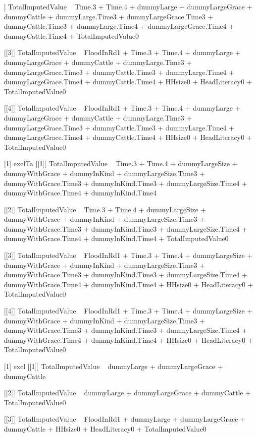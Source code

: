\begin{Schunk}
\begin{Soutput}
[[2]]
TotalImputedValue ~ Time.3 + Time.4 + dummyLarge + dummyLargeGrace + 
    dummyCattle + dummyLarge.Time3 + dummyLargeGrace.Time3 + 
    dummyCattle.Time3 + dummyLarge.Time4 + dummyLargeGrace.Time4 + 
    dummyCattle.Time4 + TotalImputedValue0

[[3]]
TotalImputedValue ~ FloodInRd1 + Time.3 + Time.4 + dummyLarge + 
    dummyLargeGrace + dummyCattle + dummyLarge.Time3 + dummyLargeGrace.Time3 + 
    dummyCattle.Time3 + dummyLarge.Time4 + dummyLargeGrace.Time4 + 
    dummyCattle.Time4 + HHsize0 + HeadLiteracy0 + TotalImputedValue0

[[4]]
TotalImputedValue ~ FloodInRd1 + Time.3 + Time.4 + dummyLarge + 
    dummyLargeGrace + dummyCattle + dummyLarge.Time3 + dummyLargeGrace.Time3 + 
    dummyCattle.Time3 + dummyLarge.Time4 + dummyLargeGrace.Time4 + 
    dummyCattle.Time4 + HHsize0 + HeadLiteracy0 + TotalImputedValue0

[1] exclTa
[[1]]
TotalImputedValue ~ Time.3 + Time.4 + dummyLargeSize + dummyWithGrace + 
    dummyInKind + dummyLargeSize.Time3 + dummyWithGrace.Time3 + 
    dummyInKind.Time3 + dummyLargeSize.Time4 + dummyWithGrace.Time4 + 
    dummyInKind.Time4

[[2]]
TotalImputedValue ~ Time.3 + Time.4 + dummyLargeSize + dummyWithGrace + 
    dummyInKind + dummyLargeSize.Time3 + dummyWithGrace.Time3 + 
    dummyInKind.Time3 + dummyLargeSize.Time4 + dummyWithGrace.Time4 + 
    dummyInKind.Time4 + TotalImputedValue0

[[3]]
TotalImputedValue ~ FloodInRd1 + Time.3 + Time.4 + dummyLargeSize + 
    dummyWithGrace + dummyInKind + dummyLargeSize.Time3 + dummyWithGrace.Time3 + 
    dummyInKind.Time3 + dummyLargeSize.Time4 + dummyWithGrace.Time4 + 
    dummyInKind.Time4 + HHsize0 + HeadLiteracy0 + TotalImputedValue0

[[4]]
TotalImputedValue ~ FloodInRd1 + Time.3 + Time.4 + dummyLargeSize + 
    dummyWithGrace + dummyInKind + dummyLargeSize.Time3 + dummyWithGrace.Time3 + 
    dummyInKind.Time3 + dummyLargeSize.Time4 + dummyWithGrace.Time4 + 
    dummyInKind.Time4 + HHsize0 + HeadLiteracy0 + TotalImputedValue0

[1] excl
[[1]]
TotalImputedValue ~ dummyLarge + dummyLargeGrace + dummyCattle

[[2]]
TotalImputedValue ~ dummyLarge + dummyLargeGrace + dummyCattle + 
    TotalImputedValue0

[[3]]
TotalImputedValue ~ FloodInRd1 + dummyLarge + dummyLargeGrace + 
    dummyCattle + HHsize0 + HeadLiteracy0 + TotalImputedValue0


\end{Soutput}
\end{Schunk}
